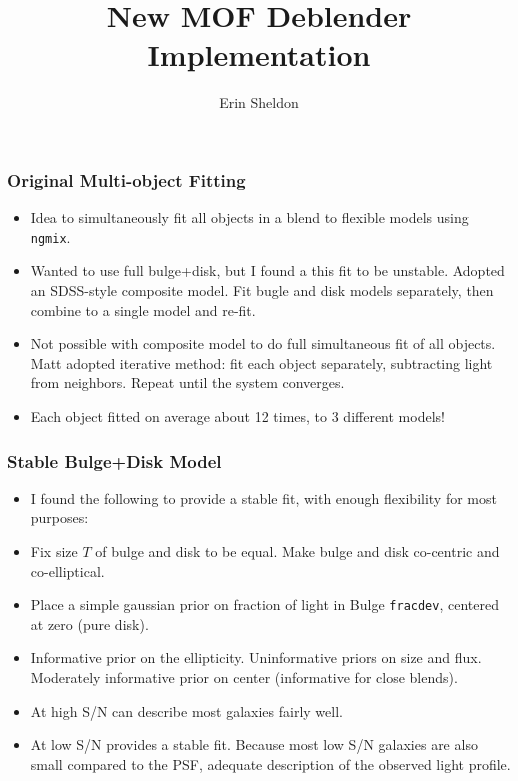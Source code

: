 \documentclass{beamer}
\title{New MOF Deblender Implementation}
\author{Erin Sheldon}
\institute{Brookhaven National Laboratory}
\newcommand{\ngmix}{\texttt{ngmix}}
\begin{document}
\frame{\titlepage}




\frame
{
    \frametitle{Original Multi-object Fitting}

    \begin{itemize}

        \item Idea to simultaneously fit all objects in a blend to 
            flexible models using \ngmix.

        \item Wanted to use full bulge+disk, but I found a this fit to be
            unstable. Adopted an SDSS-style composite model.  Fit bugle and
            disk models separately, then combine to a single model and re-fit.

        \item Not possible with composite model to do full simultaneous fit of
            all objects.  Matt adopted iterative method:  fit each object
            separately, subtracting light from neighbors.  Repeat until the
            system converges.
            
        \item Each object fitted on average about 12 times, to 3 different
            models!

    \end{itemize}

}

\frame
{
    \frametitle{Stable Bulge+Disk Model}

    \begin{itemize}

        \item I found the following to provide a stable fit, with
            enough flexibility for most purposes:

        \item Fix size $T$ of bulge and disk to be equal.  Make
            bulge and disk co-centric and co-elliptical.

        \item Place a simple gaussian prior on fraction of light
            in Bulge \texttt{fracdev}, centered at zero (pure disk).

        \item Informative prior on the ellipticity.  Uninformative
            priors on size and flux.  Moderately informative prior
            on center (informative for close blends).

        \item At high S/N can describe most galaxies fairly well.
            
        \item At low S/N provides a stable fit. Because most low S/N galaxies
            are also small compared to the PSF, adequate description of the
            observed light profile.

    \end{itemize}

}
\end{document}
